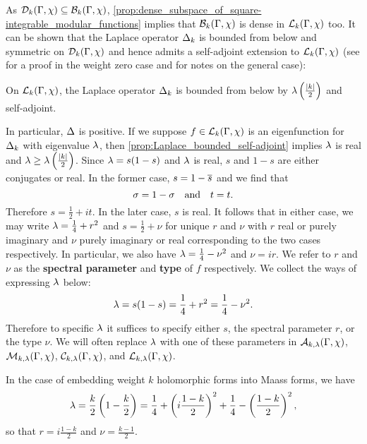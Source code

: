     As $\mathcal{D}_{k}(\Gamma,\chi) \subseteq \mathcal{B}_{k}(\Gamma,\chi)$, \cref{prop:dense_subspace_of_square-integrable_modular_functions} implies that $\mathcal{B}_{k}(\Gamma,\chi)$ is dense in $\mathcal{L}_{k}(\Gamma,\chi)$ too. It can be shown that the Laplace operator $\Delta_{k}$ is bounded from below and symmetric on $\mathcal{D}_{k}(\Gamma,\chi)$ and hence admits a self-adjoint extension to $\mathcal{L}_{k}(\Gamma,\chi)$ (see \cite{iwaniec2002spectral} for a proof in the weight zero case and \cite{duke2002subconvexity} for notes on the general case):

    \begin{proposition}\label{prop:Laplace_bounded_self-adjoint}
      On $\mathcal{L}_{k}(\Gamma,\chi)$, the Laplace operator $\Delta_{k}$ is bounded from below by $\lambda\left(\frac{|k|}{2}\right)$ and self-adjoint.
    \end{proposition}

    In particular, $\Delta$ is positive. If we suppose $f \in \mathcal{L}_{k}(\Gamma,\chi)$ is an eigenfunction for $\Delta_{k}$ with eigenvalue $\lambda$, then \cref{prop:Laplace_bounded_self-adjoint} implies $\lambda$ is real and $\lambda \ge \lambda\left(\frac{|k|}{2}\right)$. Since $\lambda = s(1-s)$ and $\lambda$ is real, $s$ and $1-s$ are either conjugates or real. In the former case, $s = 1-\overline{s}$ and we find that
    \[
      \sigma = 1-\sigma \quad \text{and} \quad t = t.
    \]
    Therefore $s = \frac{1}{2}+it$. In the later case, $s$ is real. It follows that in either case, we may write $\lambda = \frac{1}{4}+r^{2}$ and $s = \frac{1}{2}+\nu$ for unique $r$ and $\nu$ with $r$ real or purely imaginary and $\nu$ purely imaginary or real corresponding to the two cases respectively. In particular, we also have $\lambda = \frac{1}{4}-\nu^{2}$ and $\nu = ir$. We refer to $r$ and $\nu$ as the \textbf{spectral parameter} and \textbf{type} of $f$ respectively. We collect the ways of expressing $\lambda$ below:
    \[
      \lambda = s(1-s) = \frac{1}{4}+r^{2} = \frac{1}{4}-\nu^{2}.
    \]
    Therefore to specific $\lambda$ it suffices to specify either $s$, the spectral parameter $r$, or the type $\nu$. We will often replace $\lambda$ with one of these parameters in $\mathcal{A}_{k,\lambda}(\Gamma,\chi)$, $\mathcal{M}_{k,\lambda}(\Gamma,\chi)$, $\mathcal{C}_{k,\lambda}(\Gamma,\chi)$, and $\mathcal{L}_{k,\lambda}(\Gamma,\chi)$. 
    
    \begin{remark}
      In the case of embedding weight $k$ holomorphic forms into Maass forms, we have
      \[
        \lambda = \frac{k}{2}\left(1-\frac{k}{2}\right) = \frac{1}{4}+\left(i\frac{1-k}{2}\right)^{2}+\frac{1}{4}-\left(\frac{1-k}{2}\right)^{2},
      \]
      so that $r = i\frac{1-k}{2}$ and $\nu = \frac{k-1}{2}$.
    \end{remark}
    
